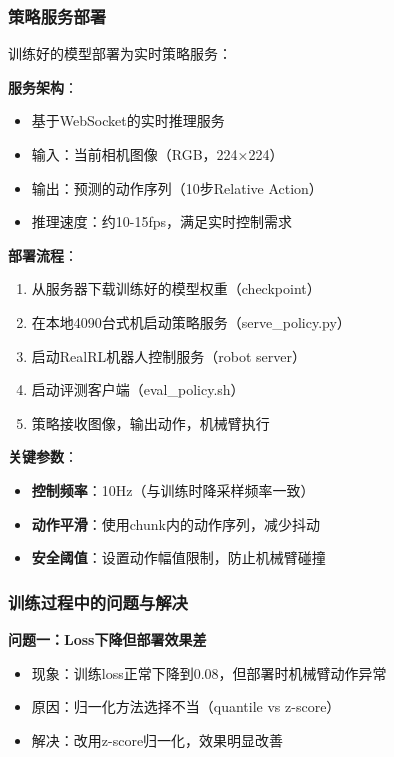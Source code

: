 \subsubsection{策略服务部署}

训练好的模型部署为实时策略服务：

\textbf{服务架构}：
\begin{itemize}[leftmargin=2em]
    \item 基于WebSocket的实时推理服务
    \item 输入：当前相机图像（RGB，224×224）
    \item 输出：预测的动作序列（10步Relative Action）
    \item 推理速度：约10-15fps，满足实时控制需求
\end{itemize}

\textbf{部署流程}：
\begin{enumerate}[leftmargin=2em]
    \item 从服务器下载训练好的模型权重（checkpoint）
    \item 在本地4090台式机启动策略服务（serve\_policy.py）
    \item 启动RealRL机器人控制服务（robot server）
    \item 启动评测客户端（eval\_policy.sh）
    \item 策略接收图像，输出动作，机械臂执行
\end{enumerate}

\textbf{关键参数}：
\begin{itemize}[leftmargin=2em]
    \item \textbf{控制频率}：10Hz（与训练时降采样频率一致）
    \item \textbf{动作平滑}：使用chunk内的动作序列，减少抖动
    \item \textbf{安全阈值}：设置动作幅值限制，防止机械臂碰撞
\end{itemize}

\subsubsection{训练过程中的问题与解决}

\textbf{问题一：Loss下降但部署效果差}
\begin{itemize}[leftmargin=2em]
    \item 现象：训练loss正常下降到0.08，但部署时机械臂动作异常
    \item 原因：归一化方法选择不当（quantile vs z-score）
    \item 解决：改用z-score归一化，效果明显改善
\end{itemize}

